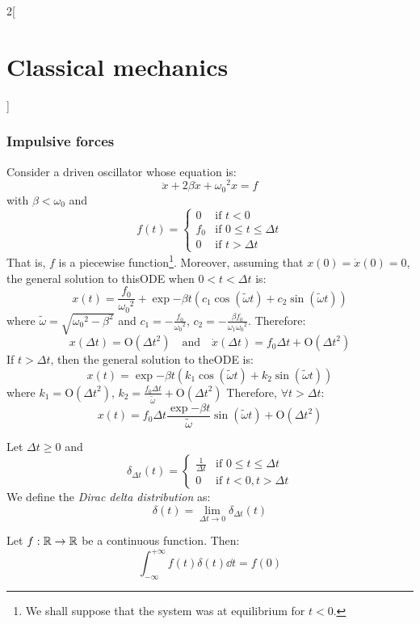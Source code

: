 \documentclass[../../../main_physics.tex]{subfiles}
\begin{document}
\begin{multicols}{2}[\section{Classical mechanics}]
  \subsubsection{Impulsive forces}
  \begin{proposition}
    Consider a driven oscillator whose equation is:
    \begin{equation}\label{CM_impulse}
      \ddot{x}+2\beta\dot{x}+{\omega_0}^2x=f
    \end{equation}
    with $\beta<\omega_0$ and $$f(t)=
      \begin{cases}
        0   & \text{if }t<0                  \\
        f_0 & \text{if }0\leq t\leq \Delta t \\
        0   & \text{if }t>\Delta t
      \end{cases}$$
    That is, $f$ is a piecewise function\footnote{We shall suppose that the system was at equilibrium for $t<0$.}. Moreover, assuming that $x(0)=\dot{x}(0)=0$, the general solution to thisODE when $0<t<\Delta t$ is:
    $$x(t)=\frac{f_0}{{\omega_0}^2}+\exp{-\beta t}\left(c_1\cos(\tilde{\omega}t)+c_2\sin(\tilde{\omega}t)\right)$$
    where $\tilde{\omega}=\sqrt{{\omega_0}^2-\beta^2}$ and $c_1=-\frac{f_0}{{\omega_0}^2}$, $c_2=-\frac{\beta f_0}{\omega_1{\omega_0}^2}$.
    Therefore: $$x(\Delta t)=\text{O}({\Delta t}^2)\quad\text{and}\quad\dot{x}(\Delta t)=f_0\Delta t+\text{O}({\Delta t}^2)$$
    If $t>\Delta t$, then the general solution to theODE is:
    $$x(t)=\exp{-\beta t}\left(k_1\cos(\tilde{\omega}t)+k_2\sin(\tilde{\omega}t)\right)$$ where $k_1=\text{O}({\Delta t}^2)$, $k_2=\frac{f_0\Delta t}{\tilde{\omega}}+\text{O}({\Delta t}^2)$
    Therefore, $\forall t>\Delta t$: $$x(t)=f_0\Delta t\frac{\exp{-\beta t}}{\tilde{\omega}}\sin(\tilde{\omega}t)+\text{O}({\Delta t}^2)$$
  \end{proposition}
  \begin{definition}
    Let $\Delta t\geq 0$ and $$\delta_{\Delta t}(t)=
      \begin{cases}
        \frac{1}{\Delta t} & \text{if }0\leq t\leq \Delta t \\
        0                  & \text{if }t<0,t>\Delta t
      \end{cases}
    $$
    We define the \emph{Dirac delta distribution} as: $$\delta(t)=\lim_{\Delta t\to 0}\delta_{\Delta t}(t)$$
  \end{definition}
  \begin{proposition}
    Let $f:\mathbb{R}\rightarrow\mathbb{R}$ be a continuous function. Then: $$\int_{-\infty}^{+\infty}f(t)\delta(t)\dd{t}=f(0)$$

\end{proposition}
\end{multicols}
\end{document}
